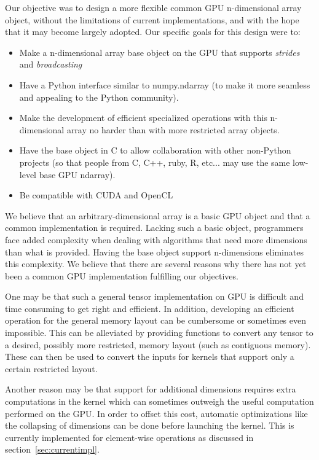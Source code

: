 \documentclass{article} %
\begin{document}
Our objective was to design a more flexible common GPU n-dimensional array object, 
without the limitations of current implementations, and with the hope that it may become largely adopted. 
Our specific goals for this design were to:

\begin{itemize}
\item Make a n-dimensional array base object on the GPU that supports \emph{strides} and \emph{broadcasting}
\item Have a Python interface similar to numpy.ndarray (to make it more seamless and appealing to the Python community).
\item Make the development of efficient specialized operations with this n-dimensional array no harder than with more restricted array objects.
\item Have the base object in C to allow collaboration with other non-Python projects (so that people from C, C++, ruby, R, etc... may use the same low-level base GPU ndarray).
\item Be compatible with CUDA and OpenCL
\end{itemize}

We believe that an arbitrary-dimensional array is a basic GPU object and that a common implementation is required.
Lacking such a basic object, programmers face added complexity when dealing with algorithms that need more dimensions than what is provided.
Having the base object support n-dimensions eliminates this complexity.
We believe that there are several reasons why there has not yet been a common GPU implementation fulfilling our objectives.

One may be that such a general tensor implementation on GPU is difficult and time consuming to get right and efficient.
In addition, developing an efficient operation for the general memory layout can be cumbersome or sometimes even impossible.
This can be alleviated by providing functions to convert any tensor to a desired, possibly more restricted, memory layout (such as contiguous memory).
These can then be used to convert the inputs for kernels that support only a certain restricted layout.

Another reason may be that support for additional dimensions requires extra computations in the kernel which can sometimes outweigh the useful computation performed on the GPU.
In order to offset this cost, automatic optimizations like the collapsing of dimensions can be done before launching the kernel.  
This is currently implemented for element-wise operations as discussed in section~\ref{sec:currentimpl}.
\end{document}

